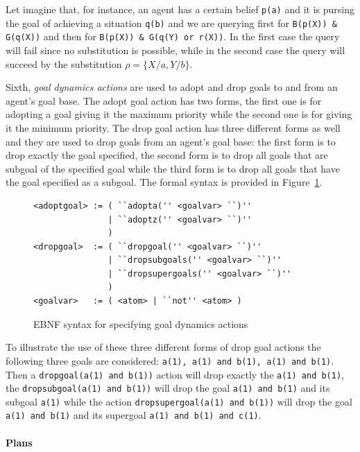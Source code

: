 \documentclass[a4paper]{article}
\begin{document}
Let imagine that, for instance, an agent has a certain belief \texttt{p(a)} and it is  pursing the goal of achieving a situation \texttt{q(b)} and we are querying first for \texttt{B(p(X)) \& G(q(X))} and then for \texttt{B(p(X)) \& G(q(Y) or r(X))}. In the first case the query will fail since no substitution is possible, while in the second case the query will succeed by the substitution $\rho=\{X/a, Y/b\}$.

Sixth, \emph{goal dynamics actions} are used to adopt and drop goals to and from an agent's goal base. The adopt goal action has two forms, the first one is for adopting a goal giving it the maximum priority while the second one is for giving it the minimum priority. The drop goal action has three different forms as well and they are used to drop goals from an agent’s goal base: the first form is to drop exactly the goal specified, the second form is to drop all goals that are subgoal of the specified goal while the third form is to drop all goals that have the goal specified as a subgoal. The formal syntax is provided in Figure~\ref{fig:ebnf_goalactions}.

\begin{figure}[htp]
\begin{verbatim}
<adoptgoal> := ( ``adopta('' <goalvar> ``)''
               | ``adoptz('' <goalvar> ``)''
               )
<dropgoal>  := ( ``dropgoal('' <goalvar> ``)''
               | ``dropsubgoals('' <goalvar> ``)''
               | ``dropsupergoals('' <goalvar> ``)''
               )
<goalvar>   := ( <atom> | ``not'' <atom> )
\end{verbatim}
\caption{EBNF syntax for specifying goal dynamics actions}
\label{fig:ebnf_goalactions}
\end{figure}

To illustrate the use of these three different forms of drop goal actions the following three goals are considered: \texttt{a(1), a(1) and b(1), a(1) and b(1)}. Then a \texttt{dropgoal(a(1) and b(1))} action will drop exactly the \texttt{a(1) and b(1)}, the \texttt{dropsubgoal(a(1) and b(1))} will drop the goal \texttt{a(1) and b(1)} and its subgoal \texttt{a(1)} while the action \texttt{dropsupergoal(a(1) and b(1))} will drop the goal \texttt{a(1) and b(1)} and its supergoal \texttt{a(1) and b(1) and c(1)}.

\paragraph{Plans}
\end{document}
